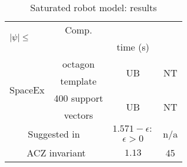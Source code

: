 \begin{table}
\begin{minipage}{0.48\textwidth}
\begin{tabular}{|l|c|c|c|}
\multirow{2}{*}{$\left|\psi\right|\leq$} & Comp.\\
\multicolumn{2}{|c|}{} & & time (s)\\
\hline
\multirow{4}{*}{SpaceEx} & octagon & \multirow{2}{*}{UB} &
\multirow{2}{*}{NT}\\
& template & & \\
\cline{2-4}
& 400 support & \multirow{2}{*}{UB} & \multirow{2}{*}{NT}\\
& vectors & & \\
\hline
\multicolumn{2}{|c|}{\multirow{2}{*}{Suggested in~\cite{heinz2014benchmark}}} &
$1.571-\epsilon:$ & \multirow{2}{*}{n/a}\\
\multicolumn{2}{|c|}{} & $\epsilon>0$ &\\
\hline
\multicolumn{2}{|c|}{\multirow{2}{*}{ACZ invariant}} & \multirow{2}{*}{$1.13$} &
\multirow{2}{*}{45}\\
\multicolumn{2}{|c|}{} & &\\
\hline
\end{tabular}
\caption{Saturated robot model: results}
~\label{tab:robot-saturated}
\vspace{-1.5em}
\end{minipage}
\end{table}

